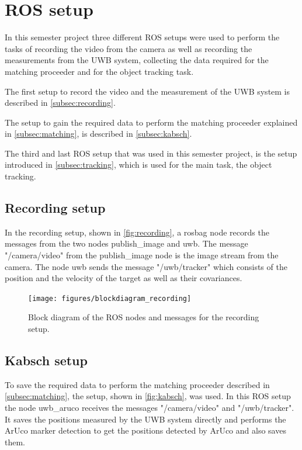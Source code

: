 \section{ROS setup}
In this semester project three different ROS setups were used to perform the tasks of recording the video from the camera as well as recording the measurements from the UWB system, collecting the data required for the matching proceeder and for the object tracking task.

The first setup to record the video and the measurement of the UWB system is described in \autoref{subsec:recording}.

The setup to gain the required data to perform the matching proceeder explained in \autoref{subsec:matching}, is described in \autoref{subsec:kabsch}.

The third and last ROS setup that was used in this semester project, is the setup introduced in \autoref{subsec:tracking}, which is used for the main task, the object tracking.

\subsection{Recording setup}\label{subsec:recording}
In the recording setup, shown in \autoref{fig:recording}, a rosbag node records the messages from the two nodes publish\_image and uwb. The message "/camera/video" from the publish\_image node is the image stream from the camera. The node uwb sends the message "/uwb/tracker" which consists of the position and the velocity of the target as well as their covariances.

\begin{figure}[h]\centering
	\texttt{[image: figures/blockdiagram\_recording]}
	\caption{Block diagram of the ROS nodes and messages for the recording setup.}\label{fig:recording}
\end{figure}

\subsection{Kabsch setup}\label{subsec:kabsch}
To save the required data to perform the matching proceeder described in \autoref{subsec:matching}, the setup, shown in \autoref{fig:kabsch}, was used. In this ROS setup the node uwb\_aruco receives the messages "/camera/video" and "/uwb/tracker". It saves the positions measured by the UWB system directly and performs the ArUco marker detection to get the positions detected by ArUco and also saves them.


